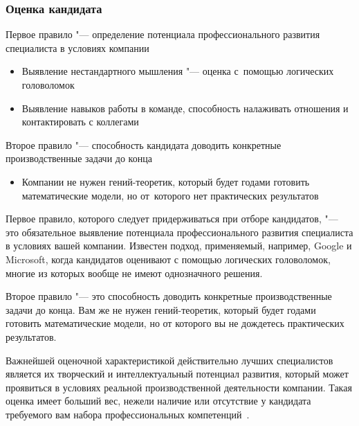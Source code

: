 \documentclass{../industrial-development}
\begin{document}
\begin{frame} \frametitle{Оценка кандидата}
	
	Первое правило "--- определение потенциала профессионального развития специалиста в условиях компании
	\begin{itemize}
		\item Выявление нестандартного мышления "--- оценка с~помощью логических головоломок
		\item Выявление навыков работы в команде, способность налаживать отношения и контактировать с коллегами
	\end{itemize}
	
	Второе правило "--- способность кандидата доводить конкретные производственные задачи до конца 
	\begin{itemize}
		\item Компании не нужен гений-теоретик, который будет годами готовить математические модели, но от~которого нет практических результатов
		
	\end{itemize}
\end{frame}

\lecturenotes

Первое правило, которого следует придерживаться при отборе кандидатов, "--- это обязательное выявление потенциала профессионального развития специалиста в условиях вашей компании. Известен подход, применяемый, например, Google и Microsoft, когда кандидатов оценивают с помощью логических головоломок, многие из которых вообще не имеют однозначного решения.

Второе правило "--- это способность доводить конкретные производственные задачи до конца. Вам же не нужен гений-теоретик, который будет годами готовить математические модели, но от которого вы не дождетесь практических результатов.

Важнейшей оценочной характеристикой действительно лучших специалистов является их творческий и интеллектуальный потенциал развития, который может проявиться в условиях реальной производственной деятельности компании. Такая оценка имеет больший вес, нежели наличие или отсутствие у кандидата требуемого вам набора профессиональных компетенций~\cite[с.~287]{Pererva}.
\end{document}
